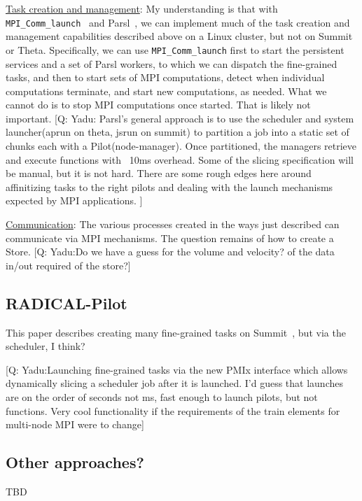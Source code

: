 \documentclass[10pt]{article}
\newcommand\q[1]{{\color{blue}[Q: #1]}}
\begin{document}
\underline{Task creation and management}: 
My understanding is that with \texttt{MPI\_Comm\_launch}~\cite{wozniak2019mpi} and Parsl~\cite{babuji19parsl}, 
we can implement much of the task creation and management capabilities described above on a Linux cluster, but not on Summit or Theta.
Specifically, we can use \texttt{MPI\_Comm\_launch} first to start the persistent services and a set of Parsl workers, to which we can dispatch the fine-grained tasks,
and then to start sets of MPI computations, detect when individual computations terminate, and start new computations, as needed.
What we cannot do is to stop MPI computations once started. That is likely not important.
\q{Yadu: Parsl's general approach is to use the scheduler and system launcher(aprun on theta, jsrun on summit) to partition a job into a static set of chunks each with a Pilot(node-manager). Once partitioned, the managers retrieve and execute functions with ~10ms overhead. Some of the slicing specification will be manual, but it is not hard. There are some rough edges here around affinitizing tasks to the right pilots and dealing with the launch mechanisms expected by MPI applications.
}

\underline{Communication}: The various processes created in the ways just described can communicate via MPI mechanisms.
The question remains of how to create a Store.
\q{Yadu:Do we have a guess for the volume and velocity? of the data in/out required of the store?}

\subsection{RADICAL-Pilot}

This paper describes creating many fine-grained tasks on Summit~\cite{turilli2019characterizing}, but via the scheduler, I think?

\q{Yadu:Launching fine-grained tasks via the new PMIx interface which allows dynamically slicing a scheduler job after it is launched. I'd guess that launches are on the order of seconds not ms, fast enough to launch pilots, but not functions. Very cool functionality if the requirements of the train elements for multi-node MPI were to change}

\subsection{Other approaches?}

TBD



\end{document}
